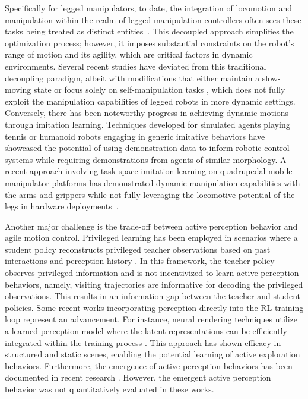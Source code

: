 \documentclass[9pt,twocolumn,twoside]{osajnl}
\begin{document}
Specifically for legged manipulators, to date, the integration of locomotion and manipulation within the realm of legged manipulation controllers often sees these tasks being treated as distinct entities~\cite{ferrolho2023roloma,zimmermann2021go,ma2022combining,sleiman2021unified,yokoyama2023asc,liu2024visual,dao2024box}. This decoupled approach simplifies the optimization process; however, it imposes substantial constraints on the robot's range of motion and its agility, which are critical factors in dynamic environments. Several recent studies have deviated from this traditional decoupling paradigm, albeit with modifications that either maintain a slow-moving state \cite{fu2023deep} or focus solely on self-manipulation tasks \cite{ma2023learning}, which does not fully exploit the manipulation capabilities of legged robots in more dynamic settings. Conversely, there has been noteworthy progress in achieving dynamic motions through imitation learning. Techniques developed for simulated agents playing tennis \cite{zhang2023vid2player3d} or humanoid robots engaging in generic imitative behaviors \cite{fu2024humanplus,cheng2024expressive} have showcased the potential of using demonstration data to inform robotic control systems while requiring demonstrations from agents of similar morphology. A recent approach involving task-space imitation learning on quadrupedal mobile manipulator platforms has demonstrated dynamic manipulation capabilities with the arms and grippers while not fully leveraging the locomotive potential of the legs in hardware deployments~\cite{ha2024umilegsmakingmanipulation}.

Another major challenge is the trade-off between active perception behavior and agile motion control. Privileged learning has been employed in scenarios where a student policy reconstructs privileged teacher observations based on past interactions and perception history \cite{lee2020learning,miki2022learning,agarwal2023legged}. In this framework, the teacher policy observes privileged information and is not incentivized to learn active perception behaviors, namely, visiting trajectories are informative for decoding the privileged observations. This results in an information gap between the teacher and student policies. Some recent works incorporating perception directly into the RL training loop represent an advancement. For instance, neural rendering techniques utilize a learned perception model where the latent representations can be efficiently integrated within the training process \cite{hoeller2022neural, hoeller2024anymal}. This approach has shown efficacy in structured and static scenes, enabling the potential learning of active exploration behaviors. Furthermore, the emergence of active perception behaviors has been documented in recent research \cite{schwarke2023curiosity, team2021open}. However, the emergent active perception behavior was not quantitatively evaluated in these works.
\end{document}
